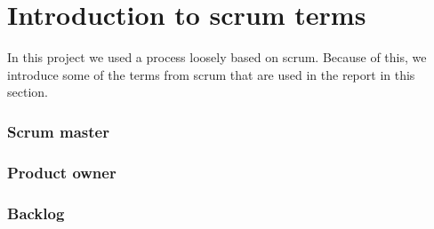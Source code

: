 \section{Introduction to scrum terms}
In this project we used a process loosely based on scrum.
Because of this, we introduce some of the terms from scrum that are used in the report in this section.

\subsubsection{Scrum master}

\subsubsection{Product owner}

\subsubsection{Backlog}
